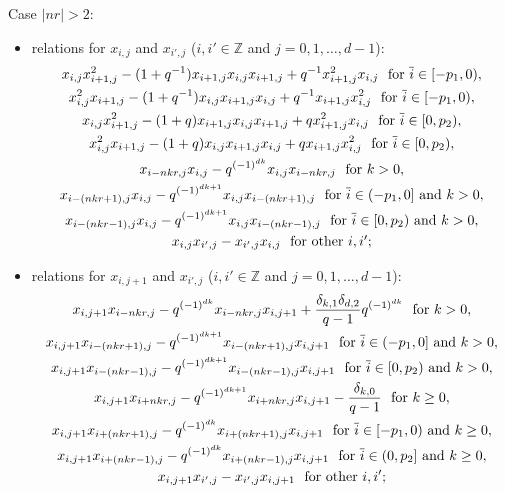 \documentclass[reqno,12pt,a4paper]{amsart}
\theoremstyle{remark}
\theoremstyle{definition}
\numberwithin{equation}{section}
\begin{document}
\smallskip
\noindent Case $|nr|>2$:
\begin{itemize}
   \item[(1)] relations for $x_{i,j}$ and $x_{i',j}$ ($i,i'\in\mathbb{Z}$ and $j=0,1,\ldots,d-1$):
   \begin{gather*}
   x_{i,j}x_{i+1,j}^2-(1+q^{-1})x_{i+1,j}x_{i,j}x_{i+1,j}+q^{-1}x_{i+1,j}^2x_{i,j} ~\hbox{ for $\overline{i}\in[-p_1,0)$},\\
   x_{i,j}^2x_{i+1,j}-(1+q^{-1})x_{i,j}x_{i+1,j}x_{i,j}+q^{-1}x_{i+1,j}x_{i,j}^2 ~\hbox{ for $\overline{i}\in[-p_1,0)$},\\
   x_{i,j}x_{i+1,j}^2-(1+q)x_{i+1,j}x_{i,j}x_{i+1,j}+qx_{i+1,j}^2x_{i,j} ~\hbox{ for $\overline{i}\in[0,p_2)$},\\
   x_{i,j}^2x_{i+1,j}-(1+q)x_{i,j}x_{i+1,j}x_{i,j}+qx_{i+1,j}x_{i,j}^2 ~\hbox{ for $\overline{i}\in[0,p_2)$},\\
   x_{i-nkr,j}x_{i,j}-q^{(-1)^{dk}}x_{i,j}x_{i-nkr,j} ~\hbox{ for } k>0,\\
   x_{i-(nkr+1),j}x_{i,j}-q^{(-1)^{dk+1}}x_{i,j}x_{i-(nkr+1),j} ~\hbox{ for $\overline{i}\in(-p_1,0]$ and $k>0$},\\
   x_{i-(nkr-1),j}x_{i,j}-q^{(-1)^{dk+1}}x_{i,j}x_{i-(nkr-1),j} ~\hbox{ for $\overline{i}\in[0,p_2)$ and $k>0$},\\
   x_{i,j}x_{i',j}-x_{i',j}x_{i,j} ~\hbox{ for other $i,i'$};
   \end{gather*}
  
\item[(2)] relations for $x_{i,j+1}$ and $x_{i',j}$ ($i,i'\in\mathbb{Z}$ and $j=0,1,\ldots,d-1$):
  \begin{gather*}
 	x_{i,j+1}x_{i-nkr,j}-q^{(-1)^{dk}}x_{i-nkr,j}x_{i,j+1}+\frac{\delta_{k,1}\delta_{d,2}}{q-1}q^{(-1)^{dk}} ~\hbox{ for } k>0,\\
	x_{i,j+1}x_{i-(nkr+1),j}-q^{(-1)^{dk+1}}x_{i-(nkr+1),j}x_{i,j+1} ~\hbox{ for $\overline{i}\in(-p_1,0]$ and $k>0$},\\
	x_{i,j+1}x_{i-(nkr-1),j}-q^{(-1)^{dk+1}}x_{i-(nkr-1),j}x_{i,j+1} ~\hbox{ for $\overline{i}\in[0,p_2)$ and $k>0$},\\
  	x_{i,j+1}x_{i+nkr,j}-q^{(-1)^{dk+1}}x_{i+nkr,j}x_{i,j+1}-\frac{\delta_{k,0}}{q-1} ~\hbox{ for } k\geq0,\\
  	x_{i,j+1}x_{i+(nkr+1),j}-q^{(-1)^{dk}}x_{i+(nkr+1),j}x_{i,j+1} ~\hbox{ for $\overline{i}\in[-p_1,0)$ and $k\geq0$},\\
  	x_{i,j+1}x_{i+(nkr-1),j}-q^{(-1)^{dk}}x_{i+(nkr-1),j}x_{i,j+1} ~\hbox{ for $\overline{i}\in(0,p_2]$ and $k\geq0$},\\
  	x_{i,j+1}x_{i',j}-x_{i',j}x_{i,j+1} ~\hbox{ for other }i,i';
  \end{gather*}
  

\end{itemize}
\end{document}
